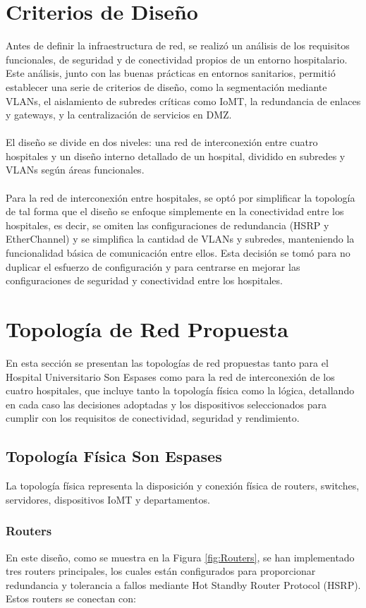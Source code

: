 \section{Criterios de Diseño}
\label{sec:criterios}
Antes de definir la infraestructura de red, se realizó un análisis de los requisitos funcionales, de seguridad y de conectividad propios de un entorno hospitalario. Este 
análisis, junto con las buenas prácticas en entornos sanitarios, permitió establecer una serie de criterios de diseño, como la segmentación mediante VLANs, el aislamiento 
de subredes críticas como IoMT, la redundancia de enlaces y gateways, y la centralización de servicios en DMZ.
\\ \\
El diseño se divide en dos niveles: una red de interconexión entre cuatro hospitales y un diseño interno detallado de un hospital, dividido en subredes y VLANs según áreas funcionales.
\\  \\
Para la red de interconexión entre hospitales, se optó por simplificar la topología de tal forma que el diseño se enfoque simplemente en la conectividad entre los hospitales, es decir,
se omiten las configuraciones de redundancia (HSRP y EtherChannel) y se simplifica la cantidad de VLANs y subredes, manteniendo la funcionalidad básica de comunicación entre ellos. Esta decisión se tomó 
para no duplicar el esfuerzo de configuración y para centrarse en mejorar las configuraciones de seguridad y conectividad entre los hospitales. 

\section{Topología de Red Propuesta}
En esta sección se presentan las topologías de red propuestas tanto para el Hospital Universitario Son Espases como para la red de interconexión de los cuatro hospitales, que incluye tanto la topología física como la lógica, detallando en cada caso las decisiones adoptadas
y los dispositivos seleccionados para cumplir con los requisitos de conectividad, seguridad y rendimiento.

\subsection{Topología Física Son Espases}
La topología física representa la disposición y conexión física de routers, switches, servidores, dispositivos IoMT y departamentos.
\subsubsection{Routers}
En este diseño, como se muestra en la Figura \ref{fig:Routers}, se han implementado tres routers principales, los cuales están configurados para proporcionar 
redundancia y tolerancia a fallos mediante Hot Standby Router Protocol (HSRP). Estos routers se conectan con:

